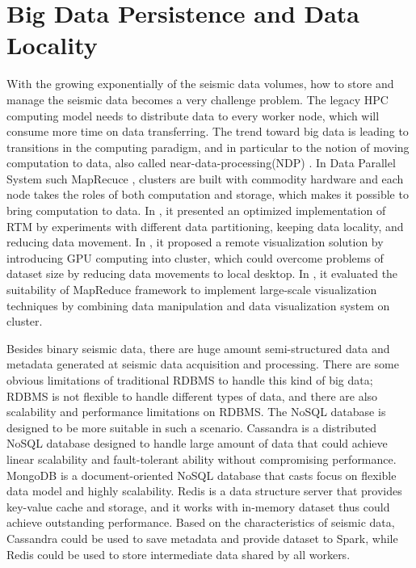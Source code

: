 \section{Big Data Persistence and Data Locality}
With the growing exponentially of the seismic data volumes, how to store and manage the seismic data becomes a very challenge problem. The legacy HPC computing model needs to distribute data to every worker node, which will consume more time on data transferring. The trend toward big data is leading to transitions in the computing paradigm, and in particular to the notion of moving computation to data, also called near-data-processing(NDP) \cite{6871738BalasubramonianNDP}. In Data Parallel System such MapRecuce \cite{6217449GuoDataLocalityMapReduce}, clusters are built with commodity hardware and each node takes the roles of both computation and storage, which makes it possible to bring computation to data. In \cite{6267846PerroneReducingDataMovement}, it presented an optimized implementation of RTM by experiments with different data partitioning, keeping data locality, and reducing data movement. In \cite{NextDataCenterVisualization}, it proposed a remote visualization solution by introducing GPU computing into cluster, which could overcome problems of dataset size by reducing data movements to local desktop. In \cite{6092321VoParaVisMapReduce}, it evaluated the suitability of MapReduce framework to implement large-scale visualization techniques by combining data manipulation and data visualization system on cluster. 

Besides  binary seismic data, there are huge amount semi-structured data and metadata generated at seismic data acquisition and processing. There are some obvious limitations of traditional RDBMS to handle this kind of big data; RDBMS is not flexible to handle different types of data, and there are also scalability and performance limitations on RDBMS. The NoSQL database\cite{ApacheHBase} is designed to be more suitable in such a scenario. Cassandra \cite{ApacheCassandra} is a distributed NoSQL database designed to handle large amount of data that could achieve linear scalability and fault-tolerant ability without compromising performance. MongoDB \cite{MongoDBNoSQL} is a document-oriented NoSQL database that casts focus on flexible data model and highly scalability. Redis \cite{RedisNoSQL} is a data structure server that provides key-value cache and storage, and it works with in-memory dataset thus could achieve outstanding performance. Based on the characteristics of seismic data, Cassandra could be used to save metadata and provide dataset to Spark, while Redis could be used to store intermediate data shared by all workers.

